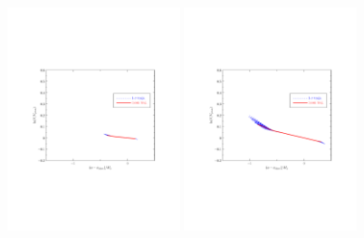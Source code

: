 \documentclass[11pt]{article}
\def \halffigwidth{0.45\textwidth}
\begin{document}
\begin{figure}
  \includegraphics[width=\halffigwidth,  trim = 1in 3in 1in 3in]{nobicep_spline0_p11_r0d02_potential_traj.pdf}%
  \includegraphics[width=\halffigwidth,  trim = 1in 3in 1in 3in]{nobicep_spline0_p11_r0d1_potential_traj.pdf}

\end{figure}
\end{document}
